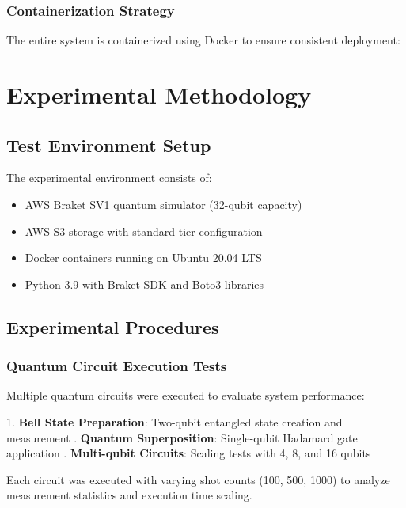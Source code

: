 \documentclass[onecolumn]{IEEEtran}
\begin{document}
\subsubsection{Containerization Strategy}

The entire system is containerized using Docker to ensure consistent deployment:



\section{Experimental Methodology}

\subsection{Test Environment Setup}

The experimental environment consists of:
\begin{itemize}
    \item AWS Braket SV1 quantum simulator (32-qubit capacity)
    \item AWS S3 storage with standard tier configuration
    \item Docker containers running on Ubuntu 20.04 LTS
    \item Python 3.9 with Braket SDK and Boto3 libraries
\end{itemize}

\subsection{Experimental Procedures}

\subsubsection{Quantum Circuit Execution Tests}

Multiple quantum circuits were executed to evaluate system performance:

\begin{itemize}
    1. \textbf{Bell State Preparation}: Two-qubit entangled state creation and measurement 
    . \textbf{Quantum Superposition}: Single-qubit Hadamard gate application . \textbf{Multi-qubit Circuits}: Scaling tests with 4, 8, and 16 qubits
\end{itemize}
    
    
Each circuit was executed with varying shot counts (100, 500, 1000) to analyze measurement statistics and execution time scaling.
\end{document}
